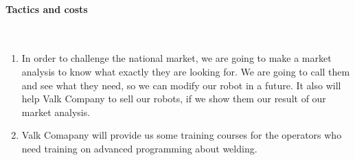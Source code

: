 \paragraph*{Tactics and costs}~\\
\begin{enumerate}
\item In order to challenge the national market, we are going to make a market analysis to know what exactly they are looking for. We are going to call them and see what they need, so we can modify our robot in a future. It also will help Valk Company to sell our robots, if we show them our result of our market analysis.
\item Valk Comapany will provide us some training courses for the operators who need training on advanced programming about welding.  
\end{enumerate}
